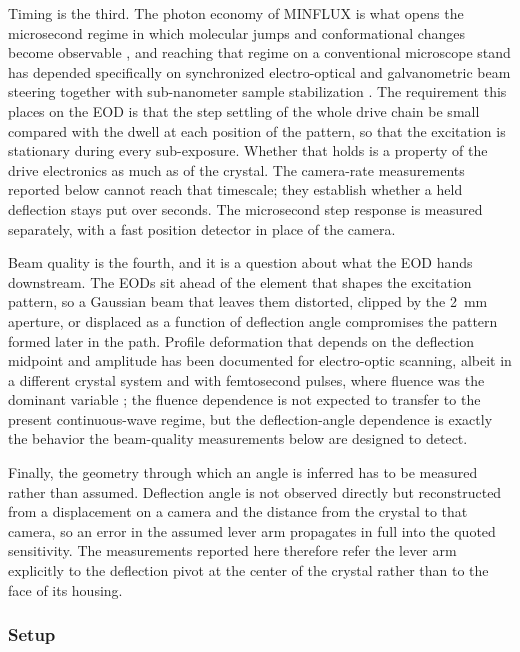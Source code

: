 \documentclass{article}
\begin{document}
Timing is the third. The photon economy of MINFLUX is what opens the microsecond regime in which
molecular jumps and conformational changes become observable
\cite{eilersMINFLUXMonitorsRapid2018}, and reaching that regime on a conventional microscope stand
has depended specifically on synchronized electro-optical and galvanometric beam steering together
with sub-nanometer sample stabilization \cite{schmidtMINFLUXNanometerscale3D2021}. The requirement
this places on the EOD is that the step settling of the whole drive chain be small compared
with the dwell at each position of the pattern, so that the excitation is stationary during every
sub-exposure. Whether that holds is a property of the drive electronics as much as of the crystal. The camera-rate measurements reported below cannot reach that timescale; they establish
whether a held deflection stays put over seconds. The microsecond step response is measured
separately, with a fast position detector in place of the camera.

Beam quality is the fourth, and it is a question about what the EOD hands downstream. The EODs
sit ahead of the element that shapes the excitation pattern, so a Gaussian beam that leaves them
distorted, clipped by the 2~mm aperture, or displaced as a function of deflection angle compromises
the pattern formed later in the path. Profile deformation that depends on the deflection midpoint
and amplitude has been documented for electro-optic scanning, albeit in a different crystal system
and with femtosecond pulses, where fluence was the dominant variable
\cite{bechtoldBeamProfileDeformation2012}; the fluence dependence is not expected to transfer to the
present continuous-wave regime, but the deflection-angle dependence is exactly the behavior the
beam-quality measurements below are designed to detect.

Finally, the geometry through which an angle is inferred has to be measured rather than assumed.
Deflection angle is not observed directly but reconstructed from a displacement on a camera and the
distance from the crystal to that camera, so an error in the assumed lever arm propagates in full
into the quoted sensitivity. The measurements reported here therefore refer the lever arm explicitly
to the deflection pivot at the center of the crystal rather than to the face of its housing.

\subsubsection{Setup}
\end{document}

